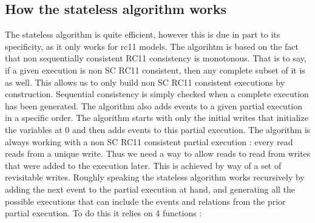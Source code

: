 \documentclass[a4,11pt]{article}
\begin{document}
\subsection{How the stateless algorithm works}

The stateless algorithm is quite efficient, however this is due in part to its specificity, as it only works for rc11 models. The algorihtm is based on the fact that non sequentially consistent RC11 consistency is monotonous. That is to say, if a given execution is non SC RC11 consistent, then any complete subset of it is as well. This allows us to only build non SC RC11 consistent executions by construction. Sequential consistency is simply checked when a complete execution has been generated. The algorithm also adds events to a given partial execution in a specific order. The algorithm starts with only the initial writes that initialize the variables at 0 and then adds events to this partial execution. The algorithm is always working with a non SC RC11 consistent partial execution : every read reads from a unique write. Thus we need a way to allow reads to read from writes that were added to the execution later. This is achieved by way of a set of revisitable writes.
Roughly speaking the stateless algorithm works recursively by adding the next event to the partial execution at hand, and generating all the possible executions that can include the events and relations from the prior partial execution. To do this it relies on 4 functions :
\end{document}
